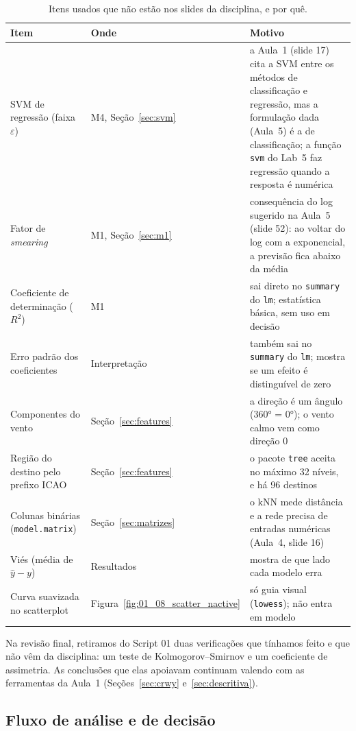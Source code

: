 \documentclass[12pt,a4paper]{article}
\begin{document}
\begin{table}[H]\centering\scriptsize
\caption{Itens usados que não estão nos slides da disciplina, e por quê.}\label{tab:fora}
\renewcommand{\arraystretch}{1.2}
\begin{tabular}{p{3.6cm}p{4.2cm}p{6.3cm}}
\toprule
Item & Onde & Motivo\\
\midrule
SVM de regressão (faixa $\varepsilon$) & M4, Seção~\ref{sec:svm} & a Aula~1 (slide 17) cita a SVM entre os métodos de classificação e regressão, mas a formulação dada (Aula~5) é a de classificação; a função \texttt{svm} do Lab~5 faz regressão quando a resposta é numérica\\
Fator de \textit{smearing} & M1, Seção~\ref{sec:m1} & consequência do log sugerido na Aula~5 (slide 52): ao voltar do log com a exponencial, a previsão fica abaixo da média\\
Coeficiente de determinação ($R^2$) & M1 & sai direto no \texttt{summary} do \texttt{lm}; estatística básica, sem uso em decisão\\
Erro padrão dos coeficientes & Interpretação & também sai no \texttt{summary} do \texttt{lm}; mostra se um efeito é distinguível de zero\\
Componentes do vento & Seção~\ref{sec:features} & a direção é um ângulo (360° = 0°); o vento calmo vem como direção 0\\
Região do destino pelo prefixo ICAO & Seção~\ref{sec:features} & o pacote \texttt{tree} aceita no máximo 32 níveis, e há 96 destinos\\
Colunas binárias (\texttt{model.matrix}) & Seção~\ref{sec:matrizes} & o kNN mede distância e a rede precisa de entradas numéricas (Aula~4, slide 16)\\
Viés (média de $\hat{y}-y$) & Resultados & mostra de que lado cada modelo erra\\
Curva suavizada no scatterplot & Figura~\ref{fig:01_08_scatter_nactive} & só guia visual (\texttt{lowess}); não entra em modelo\\
\bottomrule
\end{tabular}
\end{table}

Na revisão final, retiramos do Script 01 duas verificações que tínhamos feito e que não vêm da disciplina: um teste de Kolmogorov--Smirnov e um coeficiente de assimetria. As conclusões que elas apoiavam continuam valendo com as ferramentas da Aula~1 (Seções~\ref{sec:crwy} e~\ref{sec:descritiva}).

\subsection{Fluxo de análise e de decisão}
\end{document}
